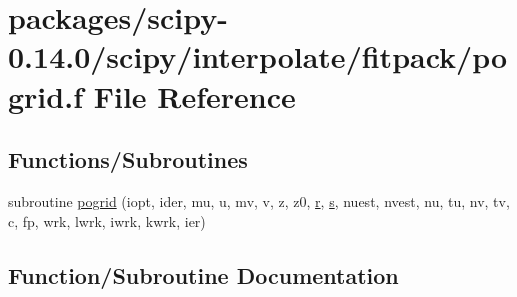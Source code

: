 \hypertarget{pogrid_8f}{}\section{packages/scipy-\/0.14.0/scipy/interpolate/fitpack/pogrid.f File Reference}
\label{pogrid_8f}
\subsection*{Functions/\+Subroutines}
\begin{DoxyCompactItemize}
\item 
subroutine \hyperlink{pogrid_8f_aab2a633fd2ac6766c0b12dffbac84fac}{pogrid} (iopt, ider, mu, u, mv, v, z, z0, \hyperlink{indexexpr_8h_ac434fd11cc2493608d8d91424d60c17e}{r}, \hyperlink{indexexpr_8h_ae024b0db549122b44c349ae28ec990dc}{s}, nuest, nvest, nu, tu, nv, tv, c, fp, wrk, lwrk, iwrk, kwrk, ier)
\end{DoxyCompactItemize}


\subsection{Function/\+Subroutine Documentation}
\hypertarget{pogrid_8f_aab2a633fd2ac6766c0b12dffbac84fac}{}
